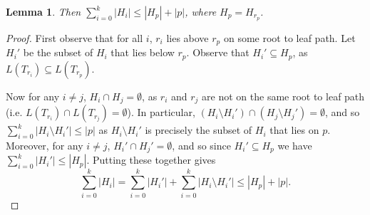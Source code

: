 \documentclass[11pt]{article}
\newtheorem{lemma}[theorem]{Lemma}
\newtheorem{corollary}[theorem]{Corollary}
\theoremstyle{definition}
\newcommand{\Lem}[1]{\hyperref[lem:#1]{Lemma~\ref*{lem:#1}}} %
\newcommand{\XSays}[2]{{
      {$\rule[-0.12cm]{0.2in}{0.5cm}$\fbox{\tt
            #1:} }
      \textcolor{red}{#2}
      \marginpar{\textcolor{blue}{#1}}
      {$\rule[0.1cm]{0.3in}{0.1cm}$\fbox{\tt
            end}$\rule[0.1cm]{0.3in}{0.1cm}$}
      }
   }
\newcommand{\Ben}[1]{{\XSays{Ben}{#1}}}
\begin{document}
{\begin{lemma}
 Then $\sum_{i=0}^k |H_i| \leq |H_p|+|p|$, where $H_p = H_{r_p}$.
\end{lemma}
\begin{proof} 
 First observe that for all $i$, $r_{i}$ lies above $r_p$ on some root to leaf path. 
 Let $H_i'$ be the subset of $H_i$ that lies below $r_p$.  Observe that $H_i'\subseteq H_p$, as $L(T_{r_i})\subseteq L(T_{r_p})$.
  
 Now for any $i\neq j$, $H_i \cap H_j = \emptyset$, as $r_{i}$ and $r_{j}$ are not on the same root to leaf path (i.e. $L(T_{r_i}) \cap L(T_{r_j}) = \emptyset$).
 In particular, $(H_i\setminus H_i') \cap (H_j \setminus H_j') = \emptyset$, and so $\sum_{i=0}^k |H_i\setminus H_i'| \leq |p|$ 
 as $H_i\setminus H_i'$ is precisely the subset of $H_i$ that lies on $p$.
 Moreover, for any $i\neq j$, $ H_i' \cap H_j' = \emptyset$, and so since $H_i'\subseteq H_p$ we have $\sum_{i=0}^k |H_i'|\leq |H_p|$.
 Putting these together gives
 \[
  \sum_{i=0}^k |H_i| = \sum_{i=0}^k |H_i'| + \sum_{i=0}^k |H_i\setminus H_i'| \leq |H_p|+|p|.
 \]
\end{proof}

% 
% 
% 
% 
%  

}
\end{document}
